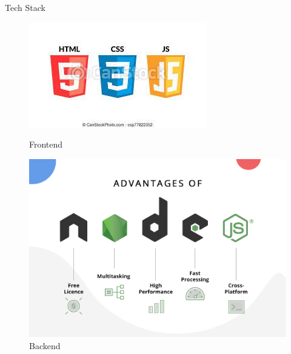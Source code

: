\documentclass{beamer}
\begin{document}
	\begin{frame}{Tech Stack}
		
    \begin{figure}
        \begin{minipage}[t]{0.2\textwidth}
            \centering
            \includegraphics[width=\textwidth]{frontend.jpeg}
            \caption{Frontend}
        \end{minipage}\hfill
        \begin{minipage}[t]{0.2\textwidth}
            \centering
            \includegraphics[width=\textwidth]{node.js_backend.png}
            \caption{Backend}
        \end{minipage}\hfill
        \begin{minipage}[t]{0.2\textwidth}
            \centering

\end{minipage}
\end{figure}
\end{frame}
\end{document}
